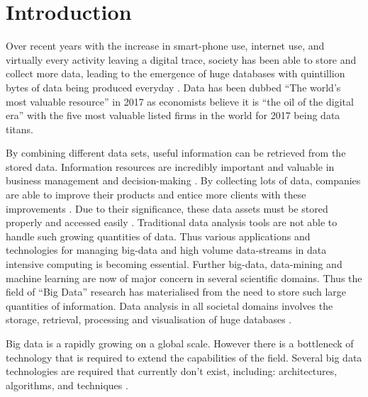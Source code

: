 %
%
%
%
\chapter{Introduction}\label{chap:introduction}
\vspace{-1cm}

Over recent years with the increase in smart-phone use, internet use, and virtually every activity leaving a digital trace, society has been able to store and collect more data, leading to the emergence of huge databases with quintillion bytes of data being produced everyday \cite{economist:2017:twm}. Data has been dubbed ``The world's most valuable resource'' in 2017 as economists believe it is ``the oil of the digital era'' with the five most valuable listed firms in the world for 2017 being data titans\cite{economist:2017:twm}. 

By combining different data sets, useful information can be retrieved from the stored data. Information resources are incredibly important and valuable in business management and decision-making \cite{golfarelli:2009:dwd,wang:2014sar}. By collecting lots of data, companies are able to improve their products and entice more clients with these improvements \cite{economist:2017:twm}. Due to their significance, these data assets must be stored properly and accessed easily \cite{golfarelli:2009:dwd}. Traditional data analysis tools are not able to handle such growing quantities of data. Thus various applications and technologies for managing big-data and high volume data-streams in data intensive computing is becoming essential. Further big-data, data-mining and machine learning are now of major concern in several scientific domains. Thus the field of “Big Data” research has materialised from the need to store such large quantities of information. Data analysis in all societal domains involves the storage, retrieval, processing and visualisation of huge databases \cite{otoo:2006:esa}. 

Big data is a rapidly growing on a global scale. However there is a bottleneck of technology that is required to extend the capabilities of the field. Several big data technologies are required that currently don't exist, including: architectures, algorithms, and techniques \cite{twala:2017:bda,moukhi:2015:dws}.

